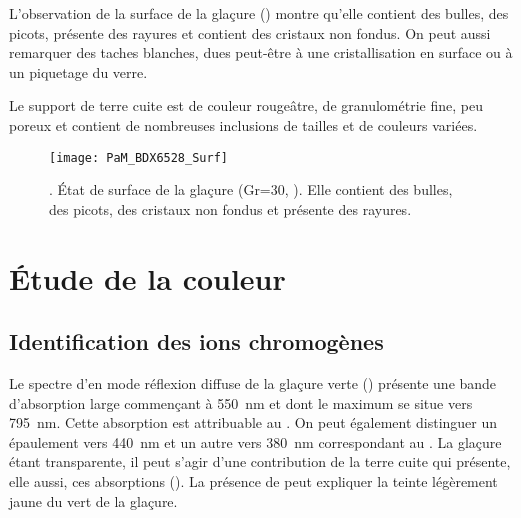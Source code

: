 L'observation de la surface de la glaçure () montre 
qu'elle contient des bulles, des picots, présente des rayures et 
contient des cristaux non fondus. On peut aussi remarquer des taches 
blanches, dues peut-être à une cristallisation en surface ou à un 
piquetage du verre.

Le support de terre cuite est de couleur rougeâtre, de granulométrie 
fine, peu poreux et contient de nombreuses inclusions de tailles et 
de couleurs variées.

\begin{figure}[htb]
  \texttt{[image: PaM\_BDX6528\_Surf]}
  \caption[\ -- État de surface de la glaçure]
          {\legendeA.
           État de surface de la glaçure 
           (Gr=30, ). 
           Elle contient des bulles, des picots, des cristaux 
           non fondus et présente des rayures.}
  \label{surf:6528}
\end{figure}


\section{Étude de la couleur}

\subsection{Identification des ions chromogènes}
Le spectre d'\AO en mode réflexion diffuse de la glaçure verte 
() présente une bande d'absorption large commençant 
à \SI{550}{nm} et dont le maximum se situe vers \SI{795}{nm}. Cette 
absorption est attribuable au  \autocite{Lajarte_1979}. On 
peut également distinguer un épaulement vers \SI{440}{nm} et un autre 
vers \SI{380}{nm} correspondant au . La glaçure étant 
transparente, il peut s'agir d'une contribution de la terre cuite 
qui présente, elle aussi, ces absorptions (). 
La présence de  peut expliquer la teinte légèrement jaune 
du vert de la glaçure.

